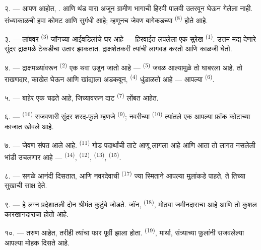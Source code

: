 २. --- आपण  आहोत, .
 आणि  थंड वारा अजून ग्रामीण भागाची हिरवी
पालवी उतरवून घेऊन गेलेला नाही. संध्याकाळची हवा कोमट आणि सुगंधी आहे; म्हणूनच
जेवण बागेकडच्या  \textsuperscript{(8)} होते आहे.

३. --- लांबवर  \textsuperscript{(3)} जॉनच्या आईवडिलांचे घर आहे ---
हिरवाईत लपलेला एक सुरेख  \textsuperscript{(1)}. उत्तम मद्य देणारे
सुंदर द्राक्षमळे टेकडीचा उतार झाकतात. द्राक्षशेतकरी त्यांची लागवड करतो आणि
काळजी घेतो.

४. --- द्राक्षमळ्यांवरून  \textsuperscript{(2)} एक थवा उडून जातो
आहे ---  \textsuperscript{(5)} जवळ आल्यामुळे तो घाबरला आहे. तो
राखणदार, काखेत  घेऊन आणि खांद्याला  अडकवून,
 \textsuperscript{(4)} धुंडाळतो आहे --- आपल्या
 \textsuperscript{(6)}.

५. ---  बाहेर एक  चढते आहे, जिच्यावरून
दाट  \textsuperscript{(7)} लोंबत आहेत.

६. ---  \textsuperscript{(16)} सजवणारी सुंदर शरद-फुले म्हणजे
 \textsuperscript{(9)}; नवरीच्या 
\textsuperscript{(10)} त्यांतले एक आपल्या फ्रॉक कोटाच्या काजात खोवले आहे.

७. --- जेवण संपत आले आहे.  \textsuperscript{(11)} गोड पदार्थांची ताटे
आणू लागला आहे आणि आता तो लागत नसलेली भांडी उचलणार आहे --- 
\textsuperscript{(14)},  \textsuperscript{(12)}, 
\textsuperscript{(13)},  \textsuperscript{(15)}.

\VUsaut{3.0mm}

८. --- सगळे आनंदी दिसतात, आणि नवरदेवाची  \textsuperscript{(17)}
ज्या स्मिताने आपल्या मुलांकडे पाहते, ते तिच्या सुखाची साक्ष देते.

९. --- हे लग्न प्रदेशातली दोन श्रीमंत कुटुंबे जोडते. जॉन, 
\textsuperscript{(18)}, मोठ्या जमीनदाराचा  आहे आणि तो कुशल
कारखानदाराचा  होतो आहे.

१०. ---  तरुण आहेत, तरीही त्यांचा  फार
पूर्वी झाला होता.  \textsuperscript{(19)}, मार्था, संत्र्याच्या
फुलांनी सजवलेल्या आपल्या  मोहक दिसते आहे.

